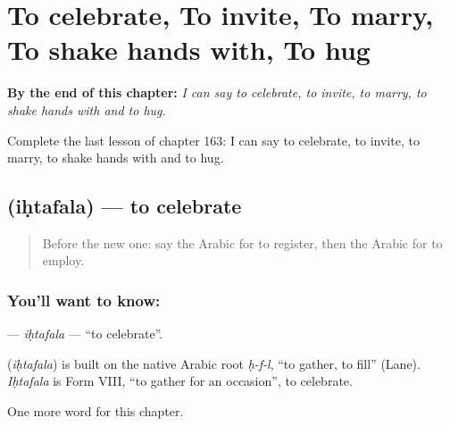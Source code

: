 
\chapter{To celebrate, To invite, To marry, To shake hands with, To hug}
\label{ch:ar-to-celebrate-to-invite-to-marry-to-shake-hands-with-to-hug}

\begin{chapteropening}
\textbf{By the end of this chapter:} \emph{I can say to celebrate, to invite, to marry, to shake hands with and to hug.}

Complete the last lesson of chapter 163: I can say to celebrate, to invite, to marry, to shake hands with and to hug.
\end{chapteropening}

\section[\texorpdfstring{\ar{احتفل} (iḥtafala)}{احتفل (iḥtafala)}]{ (iḥtafala) — to celebrate}

\label{lesson:AR-C163-ihtafala}



\begin{quote}
Before the new one: say the Arabic for to register, then the Arabic for to employ.
\end{quote}

\subsection*{You'll want to know: }
\textbf{} — \emph{iḥtafala} — \textquotedblleft{}to celebrate\textquotedblright{}.

\begin{cousinweb}
\textbf{} (\emph{iḥtafala}) is built on the native Arabic root \emph{ḥ-f-l}, \textquotedblleft{}to gather, to fill\textquotedblright{} (Lane). \emph{Iḥtafala} is Form VIII, \textquotedblleft{}to gather for an occasion\textquotedblright{}, to celebrate.
\end{cousinweb}

\begin{grammarlens}[title={What you've built}]
One more word for this chapter.
\end{grammarlens}

